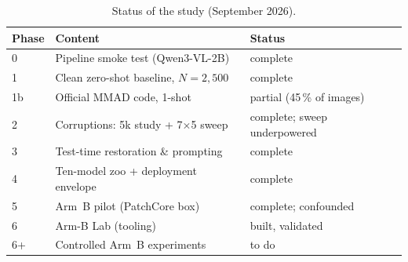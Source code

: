 \documentclass[conference]{IEEEtran}
\newcommand{\status}[1]{\textcolor{blue!60!black}{\textsf{#1}}}
\newcommand{\armB}{Arm~B}
\begin{document}
\begin{table}[t]
\centering
\caption{Status of the study (September 2026).}
\label{tab:status}
\footnotesize
\begin{tabular}{@{}p{0.9cm}p{4.3cm}p{2.1cm}@{}}
\toprule
Phase & Content & Status \\
\midrule
0 & Pipeline smoke test (Qwen3-VL-2B) & \status{complete} \\
1 & Clean zero-shot baseline, $N{=}2{,}500$ & \status{complete} \\
1b & Official MMAD code, 1-shot & \status{partial (45\,\% of images)} \\
2 & Corruptions: 5k study + 7$\times$5 sweep & \status{complete; sweep underpowered} \\
3 & Test-time restoration \& prompting & \status{complete} \\
4 & Ten-model zoo + deployment envelope & \status{complete} \\
5 & \armB{} pilot (PatchCore box) & \status{complete; confounded} \\
6 & Arm-B Lab (tooling) & \status{built, validated} \\
6+ & Controlled \armB{} experiments & \status{to do} \\
\bottomrule
\end{tabular}
\end{table}
\end{document}
